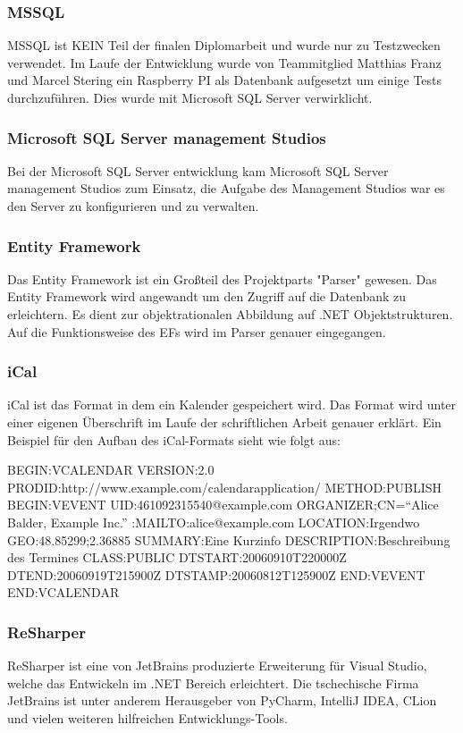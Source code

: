 \subsubsection {MSSQL}
MSSQL ist KEIN Teil der finalen Diplomarbeit und wurde nur zu Testzwecken verwendet. Im Laufe der Entwicklung wurde von Teammitglied Matthias Franz und Marcel Stering ein Raspberry PI als Datenbank aufgesetzt um einige Tests durchzuführen. Dies wurde mit Microsoft SQL Server verwirklicht. 
\subsubsection {Microsoft SQL Server management Studios}
Bei der Microsoft SQL Server entwicklung kam Microsoft SQL Server management Studios zum Einsatz, die Aufgabe des Management Studios war es den Server zu konfigurieren und zu verwalten. 
\subsubsection {Entity Framework}
Das Entity Framework ist ein Großteil des Projektparts "Parser" gewesen. Das Entity Framework wird angewandt um den Zugriff auf die Datenbank zu erleichtern. Es dient zur objektrationalen Abbildung auf .NET Objektstrukturen. Auf die Funktionsweise des EFs wird im Parser genauer eingegangen.

\subsubsection {iCal}
iCal ist das Format in dem ein Kalender gespeichert wird. Das Format wird unter einer eigenen Überschrift im Laufe der schriftlichen Arbeit genauer erklärt. 
Ein Beispiel für den Aufbau des iCal-Formats sieht wie folgt aus: \break 
\begin{flushleft}
BEGIN:VCALENDAR \break
VERSION:2.0 \break
PRODID:http://www.example.com/calendarapplication/ \break
METHOD:PUBLISH \break
BEGIN:VEVENT \break
UID:461092315540@example.com \break
ORGANIZER;CN=``Alice Balder, Example Inc.'' :MAILTO:alice@example.com \break
LOCATION:Irgendwo \break
GEO:48.85299;2.36885 \break
SUMMARY:Eine Kurzinfo \break
DESCRIPTION:Beschreibung des Termines \break
CLASS:PUBLIC \break
DTSTART:20060910T220000Z \break
DTEND:20060919T215900Z \break
DTSTAMP:20060812T125900Z \break
END:VEVENT \break
END:VCALENDAR \break
\end{flushleft}
\justifying
\subsubsection {ReSharper}
ReSharper ist eine von JetBrains produzierte Erweiterung für Visual Studio, welche das Entwickeln im .NET Bereich erleichtert. Die tschechische Firma JetBrains ist unter anderem Herausgeber von PyCharm, IntelliJ IDEA,  CLion und vielen weiteren hilfreichen Entwicklungs-Tools.

